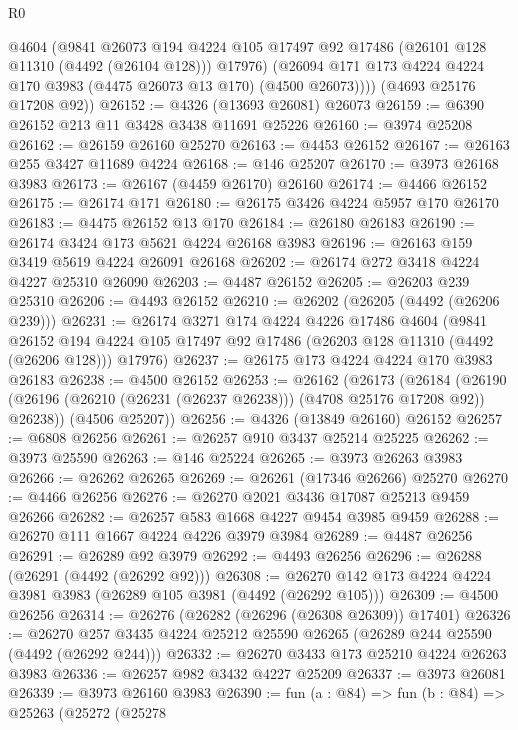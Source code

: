 \begin{lexlean}{R0}
\begin{coremodule}
          @4604
          (@9841
            @26073
            @194
            @4224
            @105
            @17497
            @92
            @17486
            (@26101 @128 @11310 (@4492 (@26104 @128)))
            @17976)
          (@26094 @171 @173 @4224 @4224 @170 @3983 (@4475 @26073 @13 @170) (@4500 @26073))))
      (@4693 @25176 @17208 @92))
@26152 := @4326 (@13693 @26081) @26073
@26159 := @6390 @26152 @213 @11 @3428 @3438 @11691 @25226
@26160 := @3974 @25208
@26162 := @26159 @26160 @25270
@26163 := @4453 @26152
@26167 := @26163 @255 @3427 @11689 @4224
@26168 := @146 @25207
@26170 := @3973 @26168 @3983
@26173 := @26167 (@4459 @26170) @26160
@26174 := @4466 @26152
@26175 := @26174 @171
@26180 := @26175 @3426 @4224 @5957 @170 @26170
@26183 := @4475 @26152 @13 @170
@26184 := @26180 @26183
@26190 := @26174 @3424 @173 @5621 @4224 @26168 @3983
@26196 := @26163 @159 @3419 @5619 @4224 @26091 @26168
@26202 := @26174 @272 @3418 @4224 @4227 @25310 @26090
@26203 := @4487 @26152
@26205 := @26203 @239 @25310
@26206 := @4493 @26152
@26210 := @26202 (@26205 (@4492 (@26206 @239)))
@26231 := @26174
    @3271
    @174
    @4224
    @4226
    @17486
    @4604
    (@9841
      @26152
      @194
      @4224
      @105
      @17497
      @92
      @17486
      (@26203 @128 @11310 (@4492 (@26206 @128)))
      @17976)
@26237 := @26175 @173 @4224 @4224 @170 @3983 @26183
@26238 := @4500 @26152
@26253 := @26162
    (@26173
      (@26184 (@26190 (@26196 (@26210 (@26231 (@26237 @26238))) (@4708 @25176 @17208 @92)) @26238))
      (@4506 @25207))
@26256 := @4326 (@13849 @26160) @26152
@26257 := @6808 @26256
@26261 := @26257 @910 @3437 @25214 @25225
@26262 := @3973 @25590
@26263 := @146 @25224
@26265 := @3973 @26263 @3983
@26266 := @26262 @26265
@26269 := @26261 (@17346 @26266) @25270
@26270 := @4466 @26256
@26276 := @26270 @2021 @3436 @17087 @25213 @9459 @26266
@26282 := @26257 @583 @1668 @4227 @9454 @3985 @9459
@26288 := @26270 @111 @1667 @4224 @4226 @3979 @3984
@26289 := @4487 @26256
@26291 := @26289 @92 @3979
@26292 := @4493 @26256
@26296 := @26288 (@26291 (@4492 (@26292 @92)))
@26308 := @26270 @142 @173 @4224 @4224 @3981 @3983 (@26289 @105 @3981 (@4492 (@26292 @105)))
@26309 := @4500 @26256
@26314 := @26276 (@26282 (@26296 (@26308 @26309)) @17401)
@26326 := @26270 @257 @3435 @4224 @25212 @25590 @26265 (@26289 @244 @25590 (@4492 (@26292 @244)))
@26332 := @26270 @3433 @173 @25210 @4224 @26263 @3983
@26336 := @26257 @982 @3432 @4227 @25209
@26337 := @3973 @26081
@26339 := @3973 @26160 @3983
@26390 := fun (a : @84) =>
  fun (b : @84) =>
  @25263
    (@25272
      (@25278

\end{coremodule}
\end{lexlean}
